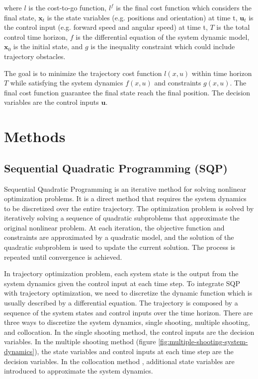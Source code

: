 \documentclass{article}
\begin{document}
where $l$ is the cost-to-go function, 
$l^f$ is the final cost function which considers the final state, 
$\textbf{x}_t$ is the state variables (e.g. positions and orientation) at time t, 
$\textbf{u}_t$ is the control input (e.g. forward speed and angular speed) at time t, 
$T$ is the total control time horizon, 
$f$ is the differential equation of the system dynamic model, 
$\textbf{x}_0$ is the initial state, and 
$g$ is the inequality constraint which could include trajectory obstacles. 

The goal is to minimize the trajectory cost function $l(x, u)$ within time horizon $T$ while satisfying the system dynamics $f(x, u)$ and constraints $g(x, u)$. The final cost function guarantee the final state reach the final position. The decision variables are the control inputs $\textbf{u}$. 

\section{Methods}
\subsection{Sequential Quadratic Programming (SQP)}

Sequential Quadratic Programming is an iterative method for solving nonlinear optimization problems. It is a direct method that requires the system dynamics to be discretized over the entire trajectory. The optimization problem is solved by iteratively solving a sequence of quadratic subproblems that approximate the original nonlinear problem. At each iteration, the objective function and constraints are approximated by a quadratic model, and the solution of the quadratic subproblem is used to update the current solution. The process is repeated until convergence is achieved.

In trajectory optimization problem, each system state is the output from the system dynamics given the control input at each time step. To integrate SQP with trajectory optimization, we need to discretize the dynamic function which is usually described by a differential equation. The trajectory is composed by a sequence of the system states and control inputs over the time horizon. There are three ways to discretize the system dynamics, single shooting, multiple shooting, and collocation. In the single shooting method, the control inputs are the decision variables. In the multiple shooting method (figure \ref{fig:multiple-shooting-system-dynamics}), the state variables and control inputs at each time step are the decision variables. In the collocation method \cite{collocation}, additional state variables are introduced to approximate the system dynamics. 
\end{document}

